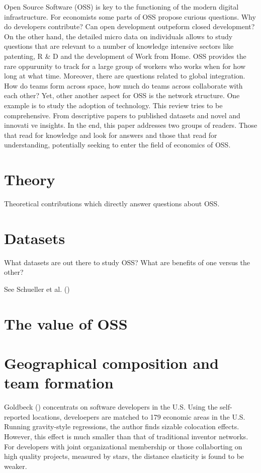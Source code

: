 \documentclass[
  12pt,
]{article}
\begin{document}
Open Source Software (OSS) is key to the functioning of the modern
digital infrastructure. For economists some parts of OSS propose curious
questions. Why do developers contribute? Can open development outpeform
closed development? On the other hand, the detailed micro data on
individuals allows to study questions that are relevant to a number of
knowledge intensive sectors like patenting, R \& D and the development
of Work from Home. OSS provides the rare oppurunity to track for a large
group of workers who works when for how long at what time. Moreover,
there are questions related to global integration. How do teams form
across space, how much do teams across collaborate with each other? Yet,
other another aspect for OSS is the network structure. One example is to
study the adoption of technology. This review tries to be comprehensive.
From descriptive papers to published datasets and novel and innovati ve
insights. In the end, this paper addresses two groups of readers. Those
that read for knowledge and look for answers and those that read for
understanding, potentially seeking to enter the field of economics of
OSS.

\section{Theory}\label{sec-theory}

Theoretical contributions which directly answer questions about OSS.

\section{Datasets}\label{sec-datasets}

What datasets are out there to study OSS? What are benefits of one
versus the other?

See Schueller et al. ()

\section{The value of OSS}\label{sec-value}

\section{Geographical composition and team formation}\label{sec-teams}

Goldbeck () concentrats on software
developers in the U.S. Using the self-reported locations, develoepers
are matched to 179 economic areas in the U.S. Running gravity-style
regressions, the author finds sizable colocation effects. However, this
effect is much smaller than that of traditional inventor networks. For
developers with joint organizational membership or those collaborting on
high quality projects, measured by stars, the distance elasticity is
found to be weaker.
\end{document}
